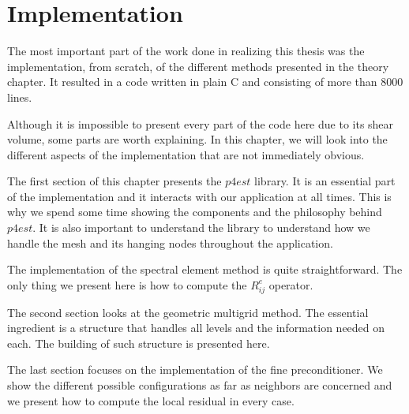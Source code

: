 \chapter{Implementation}

The most important part of the work done in realizing this thesis was the implementation, from scratch, of the different methods presented in the theory chapter. It resulted in a code written in plain C and consisting of more than 8000 lines. 

Although it is impossible to present every part of the code here due to its shear volume, some parts are worth explaining. In this chapter, we will look into the different aspects of the implementation that are not immediately obvious.   

The first section of this chapter presents the $p4est$ library. It is an essential part of the implementation and it interacts with our application at all times. This is why we spend some time showing the components and the philosophy behind $p4est$. It is also important to understand the library to understand how we handle the mesh and its hanging nodes throughout the application.

The implementation of the spectral element method is quite straightforward. The only thing we present here is how to compute the $R_{ij}^e$ operator. 

The second section looks at the geometric multigrid method. The essential ingredient is a structure that handles all levels and the information needed on each. The building of such structure is presented here. 

The last section focuses on the implementation of the fine preconditioner. We show the different possible configurations as far as neighbors are concerned and we present how to compute the local residual in every case.  
